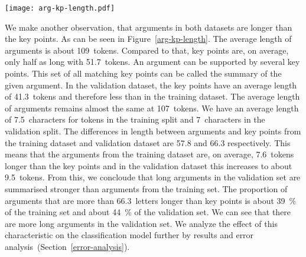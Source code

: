 \begin{figure*}
    \centering
    \texttt{[image: arg-kp-length.pdf]}
    \label{arg-kp-length}
    \caption{Differences in argument and key point lengths in the training and development set.}
\end{figure*}

We make another observation, that arguments in both datasets are longer than the key points. As can be seen in Figure~\ref{arg-kp-length}. 
The average length of arguments is about 109~tokens. Compared to that, key points are, on average, only half as long with 51.7~tokens.
An argument can be supported by several key points. This set of all matching key points can be called the summary of the given argument.  
In the validation dataset, the key points have an average length of 41.3~tokens and therefore less than in the training dataset. 
The average length of arguments remains almost the same at 107~tokens. 
We have an average length of 7.5~characters for tokens in the training split and 7~characters in the validation split. 
The differences in length between arguments and key points from the training dataset and validation dataset are 57.8 and 66.3 respectively. 
This means that the arguments from the training dataset are, on average, 7.6~tokens longer than the key points and 
in the validation dataset this increases to about 9.5~tokens. 
From this, we concloude that long arguments in the validation set are summarised stronger than arguments from the training set. 
The proportion of arguments that are more than 66.3~letters longer than key points is about 39~\% of the training set 
and about 44~\% of the validation set. 
We can see that there are more long arguments in the validation set. 
We analyze the effect of this characteristic on the classification model further by results and error analysis~(Section~\ref{error-analysis}).
